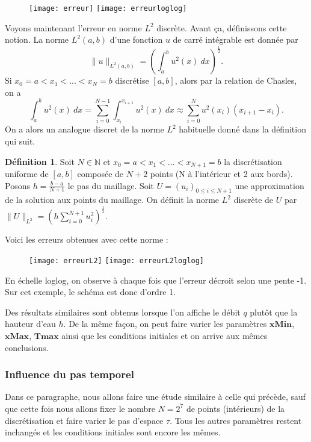 \documentclass[
11pt, %
francais, %
singlespacing, %
headsepline, %
]{MastersDoctoralThesis} %
\theoremstyle{definition}
\newtheorem{definition}{Définition}
\begin{document}
\begin{figure}
\texttt{[image: erreur]}
\texttt{[image: erreurloglog]} 
\end{figure}

Voyons maintenant l'erreur en norme $L^{2}$ discrète. Avant \c ca, définissons cette notion. La norme $L^{2}(a,b)$ d'une fonction $u$ de carré intégrable est donnée par $$\| u \|_{L^{2}(a,b)}=(\int_{a}^{b}u^{2}(x)~dx)^{\frac{1}{2}}.$$
Si $x_{0}=a<x_{1}<...<x_{N}=b$ discrétise $[a,b]$, alors par la relation de Chasles, on a $$\int_{a}^{b}u^{2}(x)~dx=\sum_{i=0}^{N-1}\int_{x_{i}}^{x_{i+1}}u^{2}(x)~dx\approx\sum_{i=0}^{N}u^{2}(x_{i})(x_{i+1}-x_{i}).$$
On a alors un analogue discret de la norme $L^{2}$ habituelle donné dans la définition qui suit.

\medskip

\begin{definition} Soit $N\in\mathbb{N}$ et $x_{0}=a<x_{1}<...<x_{N+1}=b$ la discrétisation uniforme de $[a,b]$ composée de $N+2$ points (N à l'intérieur et 2 aux bords). Posons $h=\frac{b-a}{N+1}$ le pas du maillage.
Soit $U=(u_{i})_{0\leq i \leq N+1}$ une approximation de la solution aux points du maillage. On définit la norme $L^{2}$ discrète de $U$ par $\| U \|_{L^{2}}=(h\sum_{i=0}^{N+1}u_{i}^{2})^{\frac{1}{2}}.$
\end{definition}

Voici les erreurs obtenues avec cette norme :

\begin{figure}
\texttt{[image: erreurL2]}
\texttt{[image: erreurL2loglog]} 
\end{figure}

En échelle loglog, on observe à chaque fois que l'erreur décroit selon une pente -1. Sur cet exemple, le schéma est donc d'ordre 1.

Des résultats similaires sont obtenus lorsque l'on affiche le débit $q$ plutôt que la hauteur d'eau $h$. De la même fa\c con, on peut faire varier les paramètres $\textbf{xMin}$, $\textbf{xMax}$, $\textbf{Tmax}$ ainsi que les conditions initiales et on arrive aux mêmes conclusions.

\subsubsection{Influence du pas temporel}

Dans ce paragraphe, nous allons faire une étude similaire à celle qui précède, sauf que cette fois nous allons fixer le nombre $N=2^{7}$ de points (intérieurs) de la discrétisation et faire varier le pas d'espace $\tau$.
Tous les autres paramètres restent inchangés et les conditions initiales sont encore les mêmes.
\end{document}
